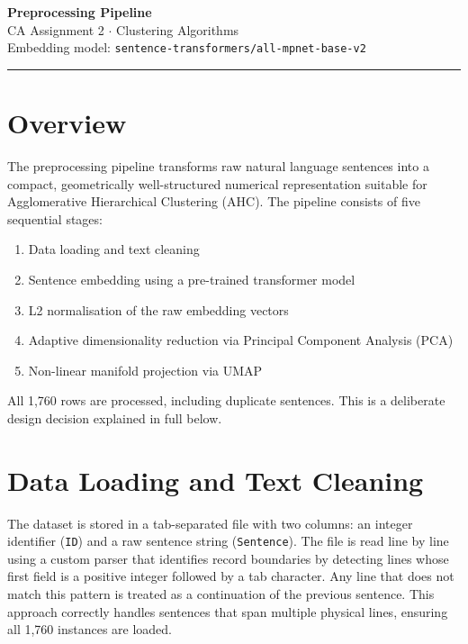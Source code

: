 \documentclass[11pt, a4paper]{article}
\begin{document}
\begin{center}
  {\LARGE\bfseries\color{darkblue} Preprocessing Pipeline}\\[4pt]
  {\normalsize CA Assignment 2 $\cdot$ Clustering Algorithms}\\[2pt]
  {\normalsize Embedding model:
    \texttt{sentence-transformers/all-mpnet-base-v2}}
\end{center}

\vspace{4pt}
\textcolor{framebd}{\rule{\linewidth}{0.8pt}}
\vspace{6pt}

\section*{Overview}

The preprocessing pipeline transforms raw natural language sentences into a
compact, geometrically well-structured numerical representation suitable for
Agglomerative Hierarchical Clustering (AHC).  The pipeline consists of five
sequential stages:

\begin{enumerate}
    \item Data loading and text cleaning
    \item Sentence embedding using a pre-trained transformer model
    \item L2 normalisation of the raw embedding vectors
    \item Adaptive dimensionality reduction via Principal Component Analysis (PCA)
    \item Non-linear manifold projection via UMAP
\end{enumerate}

All 1{,}760 rows are processed, including duplicate sentences.  This is a
deliberate design decision explained in full below.

\section{Data Loading and Text Cleaning}

The dataset is stored in a tab-separated file with two columns: an integer
identifier (\texttt{ID}) and a raw sentence string (\texttt{Sentence}).  The
file is read line by line using a custom parser that identifies record
boundaries by detecting lines whose first field is a positive integer followed
by a tab character.  Any line that does not match this pattern is treated as a
continuation of the previous sentence.  This approach correctly handles
sentences that span multiple physical lines, ensuring all 1{,}760 instances
are loaded.
\end{document}
